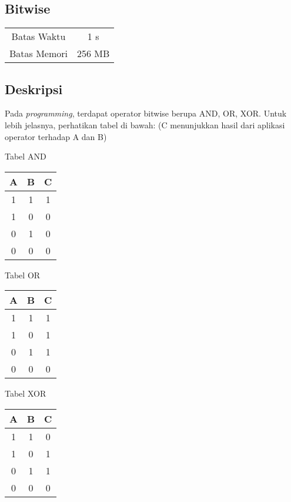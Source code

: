 \documentclass{article}
\begin{document}
\begin{center}

    
    \section*{Bitwise} %

    \begin{tabular}{ | c c | }
        \hline
        Batas Waktu  & 1 s \\    %
        Batas Memori & 256 MB \\  %
        \hline
    \end{tabular}
\end{center}

\subsection*{Deskripsi}

Pada \textit{programming}, terdapat operator bitwise berupa AND, OR, XOR.
Untuk lebih jelasnya, perhatikan tabel di bawah: (C menunjukkan hasil dari aplikasi operator terhadap A dan B)
\begin{center}
\begin{multicols}{3}
    Tabel AND

    \begin{tabular} { | c c | c | }
        \hline
        A & B & C \\
        \hline
        1 & 1 & 1 \\
        1 & 0 & 0 \\
        0 & 1 & 0 \\
        0 & 0 & 0 \\
        \hline
    \end{tabular}

    Tabel OR

    \begin{tabular} { | c c | c | }
        \hline
        A & B & C \\
        \hline
        1 & 1 & 1 \\
        1 & 0 & 1 \\
        0 & 1 & 1 \\
        0 & 0 & 0 \\
        \hline
    \end{tabular}

    Tabel XOR

    \begin{tabular} { | c c | c | }
        \hline
        A & B & C \\
        \hline
        1 & 1 & 0 \\
        1 & 0 & 1 \\
        0 & 1 & 1 \\
        0 & 0 & 0 \\
        \hline
    \end{tabular}
\end{multicols}
\end{center}
\end{document}
